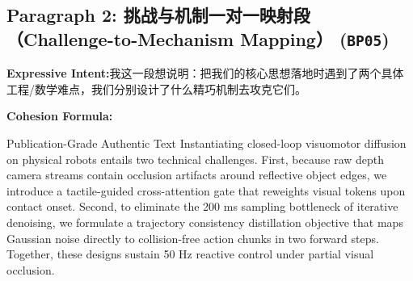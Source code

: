 \subsection*{Paragraph 2: 挑战与机制一对一映射段（Challenge-to-Mechanism Mapping） (\texttt{BP05})}
\noindent\textbf{Expressive Intent:}\enspace 我这一段想说明：把我们的核心思想落地时遇到了两个具体工程/数学难点，我们分别设计了什么精巧机制去攻克它们。\par
\noindent\textbf{Cohesion Formula:}\par\vspace{4pt}
\begin{ExampleBox}{Publication-Grade Authentic Text}
Instantiating closed-loop visuomotor diffusion on physical robots entails two technical challenges. First, because raw depth camera streams contain occlusion artifacts around reflective object edges, we introduce a tactile-guided cross-attention gate that reweights visual tokens upon contact onset. Second, to eliminate the 200 ms sampling bottleneck of iterative denoising, we formulate a trajectory consistency distillation objective that maps Gaussian noise directly to collision-free action chunks in two forward steps. Together, these designs sustain 50 Hz reactive control under partial visual occlusion.
\end{ExampleBox}

